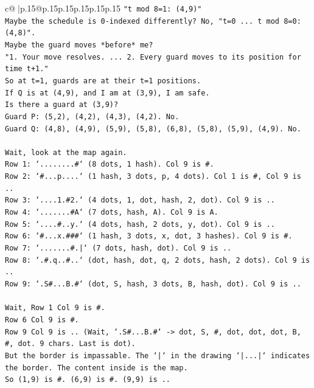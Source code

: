 \documentclass{article}
\begin{document}
{\begin{supertabular}{c@{$\;$}|p{.15\linewidth}@{}p{.15\linewidth}p{.15\linewidth}p{.15\linewidth}p{.15\linewidth}p{.15\linewidth}}
{{{\texttt{"t mod 8=1: (4,9)"} \\
\texttt{Maybe the schedule is 0{-}indexed differently? No, "t=0 ... t mod 8=0: (4,8)".} \\
\texttt{Maybe the guard moves *before* me?} \\
\texttt{"1. Your move resolves. ... 2. Every guard moves to its position for time t+1."} \\
\texttt{So at t=1, guards are at their t=1 positions.} \\
\texttt{If Q is at (4,9), and I am at (3,9), I am safe.} \\
\texttt{Is there a guard at (3,9)?} \\
\texttt{Guard P: (5,2), (4,2), (4,3), (4,2). No.} \\
\texttt{Guard Q: (4,8), (4,9), (5,9), (5,8), (6,8), (5,8), (5,9), (4,9). No.} \\
\\ 
\texttt{Wait, look at the map again.} \\
\texttt{Row 1: `........\#` (8 dots, 1 hash). Col 9 is \#.} \\
\texttt{Row 2: `\#...p....` (1 hash, 3 dots, p, 4 dots). Col 1 is \#, Col 9 is ..} \\
\texttt{Row 3: `....1.\#2.` (4 dots, 1, dot, hash, 2, dot). Col 9 is ..} \\
\texttt{Row 4: `.......\#A` (7 dots, hash, A). Col 9 is A.} \\
\texttt{Row 5: `....\#..y.` (4 dots, hash, 2 dots, y, dot). Col 9 is ..} \\
\texttt{Row 6: `\#...x.\#\#\#` (1 hash, 3 dots, x, dot, 3 hashes). Col 9 is \#.} \\
\texttt{Row 7: `.......\#.|` (7 dots, hash, dot). Col 9 is ..} \\
\texttt{Row 8: `.\#.q..\#..` (dot, hash, dot, q, 2 dots, hash, 2 dots). Col 9 is ..} \\
\texttt{Row 9: `.S\#...B.\#` (dot, S, hash, 3 dots, B, hash, dot). Col 9 is ..} \\
\\ 
\texttt{Wait, Row 1 Col 9 is \#.} \\
\texttt{Row 6 Col 9 is \#.} \\
\texttt{Row 9 Col 9 is .. (Wait, `.S\#...B.\#` {-}> dot, S, \#, dot, dot, dot, B, \#, dot. 9 chars. Last is dot).} \\
\texttt{But the border is impassable. The `|` in the drawing `|...|` indicates the border. The content inside is the map.} \\
\texttt{So (1,9) is \#. (6,9) is \#. (9,9) is ..} \\
}}}
\end{supertabular}}
\end{document}
